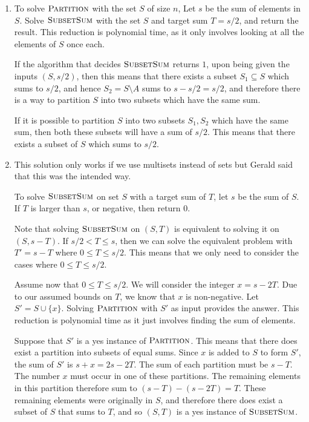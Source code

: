 \documentclass{article}
\begin{document}
\begin{solution}
\begin{enumerate}[label = (\alph*)]
    \item To solve $\mathsf{\textsc{Partition}}$ with the set $S$ of size $n$, 
    Let $s$ be the sum of elements in $S$.
    Solve $\mathsf{\textsc{SubsetSum}}$ with the set $S$ and target sum $T = s/2$, and return the result.
    This reduction is polynomial time, as it only involves looking at all the elements of $S$ once each.

    If the algorithm that decides $\mathsf{\textsc{SubsetSum}}$ returns $1$, upon being given the inputs $(S, s/2)$, 
    then this means that there exists a subset $S_1\subseteq S$ which sums to $s/2$, and hence
     $S_2 = S\setminus A$ 
sums to $s - s/2 = s/2$, and therefore there is a way to partition $S$ into two subsets which have the same sum.

    If it is possible to partition $S$ into two subsets $S_1, S_2$ which have the same sum, 
    then both these subsets will have a sum of $s/2$. This means that there exists a subset of
    $S$ which sums to $s/2$.

    \item This solution only works if we use multisets instead of sets but Gerald said that this was the intended way.

    To solve $\mathsf{\textsc{SubsetSum}}$ on set $S$ with a target sum of $T$, let $s$ be the sum of $S$.
    If $T$ is larger than $s$, or negative, then return $0$. 

    Note that solving $\mathsf{\textsc{SubsetSum}}$ on $(S, T)$ is equivalent to solving it on $(S, s-T)$.
    If $s/2 < T \leq s$, then we can solve the equivalent problem with $T' = s-T$ where $0\leq T\leq s/2$. 
    This means that we only need to consider the cases where $0\leq T \leq s/2$.

    Assume now that $0\leq T\leq s/2$. We will consider the integer $x=s-2T$. Due to our assumed bounds on $T$,
    we know that $x$ is non-negative. Let $S'=S\cup\{x\}$. Solving $\mathsf{\textsc{Partition}}$ with $S'$ as input
    provides the answer. This reduction is polynomial time as it just involves finding the sum of elements.

    Suppose that $S'$ is a yes instance of $\mathsf{\textsc{Partition}}$.
    This means that there does exist a partition into subsets of equal sums.
    Since $x$ is added to $S$ to form $S'$, the sum of $S'$ is $s + x=2s-2T$.
    The sum of each partition must be $s - T$. 
    The number $x$ must occur in one of these partitions. The remaining elements in this partition 
    therefore sum to $(s-T)-(s-2T)=T$. These remaining elements were originally in $S$, 
    and therefore there does exist a subset of $S$ that sums to $T$, and so $(S, T)$ is a yes instance of $\mathsf{\textsc{SubsetSum}}$.


\end{enumerate}
\end{solution}
\end{document}
